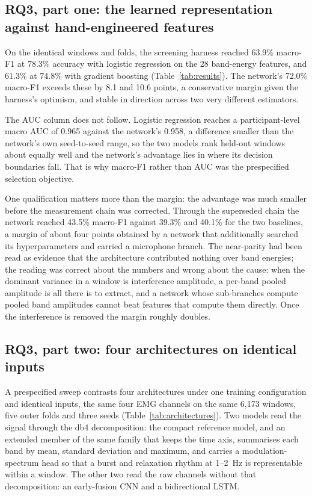 \documentclass[pdflatex,sn-nature,iicol]{sn-jnl}
\begin{document}
\subsection{RQ3, part one: the learned representation against hand-engineered features}
\label{sec:rq3}

On the identical windows and folds, the screening harness reached 63.9\% macro-F1 at 78.3\% accuracy with logistic regression on the 28 band-energy features, and 61.3\% at 74.8\% with gradient boosting (Table~\ref{tab:results}). The network's 72.0\% macro-F1 exceeds these by 8.1 and 10.6 points, a conservative margin given the harness's optimism, and stable in direction across two very different estimators.

The AUC column does not follow. Logistic regression reaches a participant-level macro AUC of 0.965 against the network's 0.958, a difference smaller than the network's own seed-to-seed range, so the two models rank held-out windows about equally well and the network's advantage lies in where its decision boundaries fall. That is why macro-F1 rather than AUC was the prespecified selection objective.

One qualification matters more than the margin: the advantage was much smaller before the measurement chain was corrected. Through the superseded chain the network reached 43.5\% macro-F1 against 39.3\% and 40.1\% for the two baselines, a margin of about four points obtained by a network that additionally searched its hyperparameters and carried a microphone branch. The near-parity had been read as evidence that the architecture contributed nothing over band energies; the reading was correct about the numbers and wrong about the cause: when the dominant variance in a window is interference amplitude, a per-band pooled amplitude is all there is to extract, and a network whose sub-branches compute pooled band amplitudes cannot beat features that compute them directly. Once the interference is removed the margin roughly doubles.

\subsection{RQ3, part two: four architectures on identical inputs}
\label{sec:deep_baselines}

A prespecified sweep contrasts four architectures under one training configuration and identical inputs, the same four EMG channels on the same 6,173 windows, five outer folds and three seeds (Table~\ref{tab:architectures}). Two models read the signal through the db4 decomposition: the compact reference model, and an extended member of the same family that keeps the time axis, summarises each band by mean, standard deviation and maximum, and carries a modulation-spectrum head so that a burst and relaxation rhythm at 1--2~Hz is representable within a window. The other two read the raw channels without that decomposition: an early-fusion CNN and a bidirectional LSTM.
\end{document}
